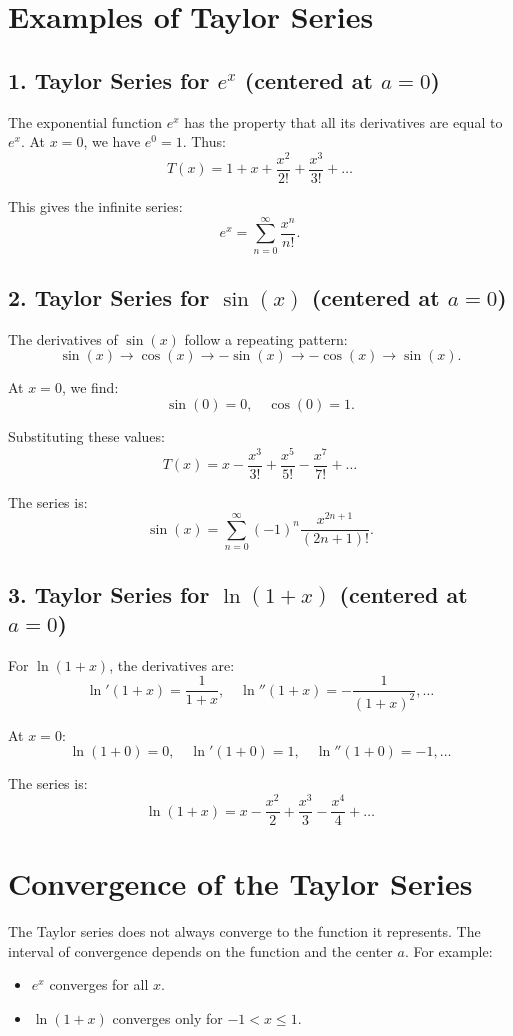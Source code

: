 \documentclass[12pt]{article}
\begin{document}
\section*{Examples of Taylor Series}

\subsection*{1. Taylor Series for $e^x$ (centered at $a=0$)}
The exponential function $e^x$ has the property that all its derivatives are equal to $e^x$. At $x=0$, we have $e^0 = 1$. Thus:
\[
T(x) = 1 + x + \frac{x^2}{2!} + \frac{x^3}{3!} + \dots
\]

This gives the infinite series:
\[
e^x = \sum_{n=0}^{\infty} \frac{x^n}{n!}.
\]

\subsection*{2. Taylor Series for $\sin(x)$ (centered at $a=0$)}
The derivatives of $\sin(x)$ follow a repeating pattern:
\[
\sin(x) \to \cos(x) \to -\sin(x) \to -\cos(x) \to \sin(x).
\]

At $x=0$, we find:
\[
\sin(0) = 0, \quad \cos(0) = 1.
\]

Substituting these values:
\[
T(x) = x - \frac{x^3}{3!} + \frac{x^5}{5!} - \frac{x^7}{7!} + \dots
\]

The series is:
\[
\sin(x) = \sum_{n=0}^{\infty} (-1)^n \frac{x^{2n+1}}{(2n+1)!}.
\]

\subsection*{3. Taylor Series for $\ln(1+x)$ (centered at $a=0$)}
For $\ln(1+x)$, the derivatives are:
\[
\ln'(1+x) = \frac{1}{1+x}, \quad \ln''(1+x) = -\frac{1}{(1+x)^2}, \dots
\]

At $x=0$:
\[
\ln(1+0) = 0, \quad \ln'(1+0) = 1, \quad \ln''(1+0) = -1, \dots
\]

The series is:
\[
\ln(1+x) = x - \frac{x^2}{2} + \frac{x^3}{3} - \frac{x^4}{4} + \dots
\]

\section*{Convergence of the Taylor Series}
The Taylor series does not always converge to the function it represents. The interval of convergence depends on the function and the center $a$. For example:
\begin{itemize}
    \item $e^x$ converges for all $x$.
    \item $\ln(1+x)$ converges only for $-1 < x \leq 1$.
\end{itemize}
\end{document}
